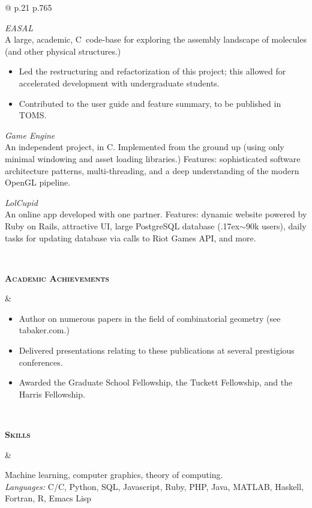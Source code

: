 \documentclass[10pt]{article}
\def\mytilde{{\raise.17ex\hbox{$\scriptstyle\mathtt{\sim}$}}}
\def\cpp{{C\nolinebreak[4]\hspace{-.05em}\raisebox{.4ex}{\tiny\bf ++}}}
\newcommand{\titlecell}[1]{%
    \begin{minipage}[t]{\linewidth}
        \raggedleft \bf
        #1
    \end{minipage}}
\newcommand{\contentcell}[1]{%
    \begin{minipage}[t]{\linewidth}
        #1
    \end{minipage}}
\newcommand{\tablerowskip}{\smallskip\smallskip}
\begin{document}
\begin{tabular}{@{} p{.21\textwidth} p{.765\textwidth}}
{        \smallskip\smallskip

        {\sl EASAL} \\
        A large, academic, \cpp\ code-base for exploring the assembly landscape of molecules (and other physical structures.)
        \begin{itemize}[itemsep=0pt,topsep=0pt] \itemsep -2pt
            \item Led the restructuring and refactorization of this project; this allowed for accelerated development with undergraduate students.
            \item Contributed to the user guide and feature summary, to be published in TOMS.
        \end{itemize}

        \smallskip\smallskip

        {\sl Game Engine} \\
        An independent project, in \cpp. Implemented from the ground up (using only minimal windowing and asset loading libraries.) Features: sophisticated software architecture patterns, multi-threading, and a deep understanding of the modern OpenGL
        pipeline.

        \smallskip\smallskip

        {\sl LolCupid} \\
        An online app developed with one partner. Features: dynamic website powered by Ruby on Rails, attractive UI, large PostgreSQL database (\mytilde 90k users), daily tasks for updating database via calls to Riot Games API, and more.
    }
    \tablerowskip
    \\

    \titlecell{\textsc{Academic Achievements}} &
    \contentcell{
        \begin{itemize}[itemsep=0pt,topsep=0pt,leftmargin=*] \itemsep -2pt
            \item Author on numerous papers in the field of combinatorial geometry (see tabaker.com.)
            \item Delivered presentations relating to these publications at several prestigious conferences.
            \item Awarded the Graduate School Fellowship, the Tuckett Fellowship, and the Harris Fellowship.
        \end{itemize}
    }
    \tablerowskip
    \\

    \titlecell{\textsc{Skills}} &
    \contentcell{
        Machine learning, computer graphics, theory of computing. \\
        {\sl Languages:} C/\cpp, Python, SQL, Javascript, Ruby, PHP, Java, MATLAB, Haskell, Fortran, R, Emacs Lisp
    }
    \tablerowskip
    \\


\end{tabular}
\end{document}
